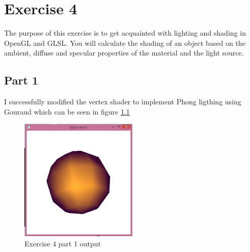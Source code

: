 \chapter{Exercise 4}
The purpose of this exercise is to get acquainted with lighting and
shading in OpenGL and GLSL.
You will calculate the shading of an object based on the ambient,
diffuse and specular properties of the material and the light source.

\section{Part 1}
I successfully modified the vertex shader to implement Phong ligthing using Gouraud
which can be seen in figure \ref{fig:exercise_4_part_1}
\begin{figure}[ht!]
	\begin{center}
		\includegraphics[width=0.5\textwidth]{figures/exercise_4_part_1}
	\end{center}
	\vspace{-4.5ex}\caption{Exercise 4 part 1 output}
	\label{fig:exercise_4_part_1} 
\end{figure}

